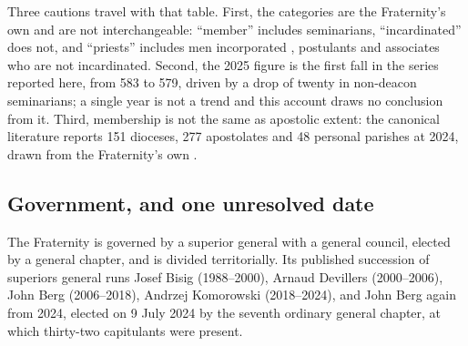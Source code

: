 Three cautions travel with that table. First, the categories are the
Fraternity's own and are not interchangeable: ``member'' includes
seminarians, ``incardinated'' does not, and ``priests'' includes men
incorporated , postulants and associates who are not
incardinated. Second, the 2025 figure is the first fall in the series
reported here, from 583 to 579, driven by a drop of twenty in non-deacon
seminarians; a single year is not a trend and this account draws no
conclusion from it. Third, membership is not the same as apostolic
extent: the canonical literature reports 151 dioceses, 277 apostolates and
48 personal parishes at 2024, drawn from the Fraternity's own
.

\subsection{Government, and one unresolved date}

The Fraternity is governed by a superior general with a general council,
elected by a general chapter, and is divided territorially. Its published
succession of superiors general runs Josef Bisig (1988--2000), Arnaud
Devillers (2000--2006), John Berg (2006--2018), Andrzej Komorowski
(2018--2024), and John Berg again from 2024, elected on 9 July 2024 by
the seventh ordinary general chapter, at which thirty-two capitulants were
present.

